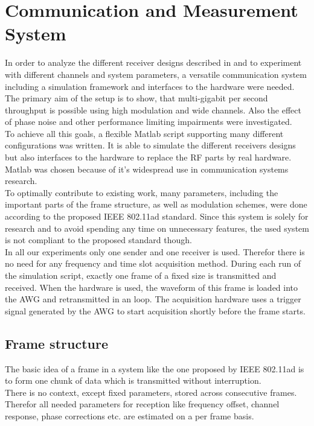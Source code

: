 \chapter{Communication and Measurement System}
In order to analyze the different receiver designs described in
 and to experiment with different channels
and system parameters, a versatile communication system
including a simulation framework and interfaces to the hardware
were needed. \\

The primary aim of the setup is to show, that multi-gigabit per second
throughput is possible using high modulation and wide channels.
Also the effect of phase noise and other performance limiting impairments
were investigated. \\

To achieve all this goals, a flexible Matlab script supporting
many different configurations was written. It is able to simulate
the different receivers designs but also interfaces to the hardware
to replace the \gls{RF} parts by real hardware. Matlab was chosen
because of it's widespread use in communication systems research. \\

To optimally contribute to existing work, many parameters, including
the important parts of the frame structure, as well as modulation
schemes, were done according to the proposed \gls{IEEE} 802.11ad standard.
Since this system is solely for research and to avoid spending any
time on unnecessary features, the used system is not compliant to the
proposed standard though. \\

In all our experiments only one sender and one receiver is used.
Therefor there is no need for any frequency and time slot acquisition
method. During each run of the simulation script, exactly one frame
of a fixed size is transmitted and received.
When the hardware is used, the waveform of this frame is loaded into
the \gls{AWG} and retransmitted in an loop.
The acquisition hardware uses a trigger signal generated by the \gls{AWG}
to start acquisition shortly before the frame starts.

\section{Frame structure}
\label{sec:sys_frame_struct}
The basic idea of a frame in a system like the one proposed by
IEEE 802.11ad is to form one chunk of data which is transmitted without
interruption. \\
There is no context, except fixed parameters, stored across consecutive
frames. Therefor all needed parameters for reception like frequency offset,
channel response, phase corrections etc. are estimated on a per frame basis. \\

